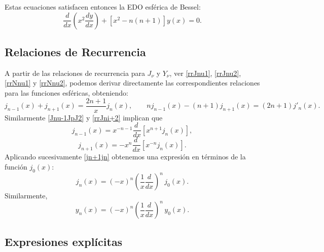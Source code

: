 Estas ecuaciones satisfacen entonces la EDO esférica de Bessel:
\begin{equation}
\boxed{\frac{d}{dx}\left(x^2\frac{dy}{dx}\right)+[x^2-n(n+1)]y(x)=0.}
\end{equation}
\subsection{Relaciones de Recurrencia}
A partir de las relaciones de recurrencia para $J_\nu$ y $Y_\nu$, ver \eqref{rrJnu1}, \eqref{rrJnu2}, \eqref{rrNnu1} y \eqref{rrNnu2}, podemos derivar directamente las correspondientes relaciones para las funciones esféricas, obteniendo:
\begin{equation}
j_{n-1}(x)+j_{n+1}(x)=\frac{2n+1}{x}j_n(x), \qquad nj_{n-1}(x)-(n+1)j_{n+1}(x)=(2n+1)j'_n(x).
\end{equation}
Similarmente \eqref{Jnu-1JpJ2} y \eqref{rrJni+2} implican que
\begin{equation}
j_{n-1}(x)=x^{-n-1}\frac{d\ }{dx}\left[x^{n+1}j_n(x)\right],
\end{equation}
\begin{equation}\label{jn+1jn}
j_{n+1}(x)=-x^{n}\frac{d\ }{dx}\left[x^{-n}j_n(x)\right].
\end{equation}
Aplicando sucesivamente \eqref{jn+1jn} obtenemos una expresión en términos de la función $j_0(x)$:
\begin{equation}
j_n(x) = (-x)^n \left(\frac{1}{x}\frac{d}{dx}\right)^n\,j_0(x) .
\end{equation}
Similarmente,
\begin{equation}
y_n(x) = (-x)^n \left(\frac{1}{x}\frac{d}{dx}\right)^n\,y_0(x).
\end{equation}

\subsection{Expresiones explícitas}


